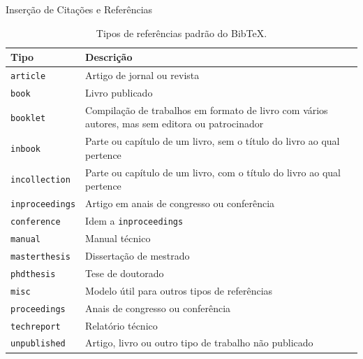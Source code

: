 \documentclass[10pt]{beamer}
\begin{document}
\begin{frame}{Inserção de Citações e Referências}
    \vspace{-0.5em}
    \begin{table}[H]
    \centering
    \caption{Tipos de referências padrão do Bib\TeX{}.}
    \vspace{-0.5em}
    {\footnotesize
        \begin{tabular}{p{2.5cm}p{7cm}}
        \toprule
        \textbf{Tipo} & \textbf{Descrição} \\
        \midrule
        {\tt article}       & Artigo de jornal ou revista \\
        {\tt book}          & Livro publicado \\
        {\tt booklet}       & Compilação de trabalhos em formato de livro com vários autores, mas sem editora ou patrocinador \\
        {\tt inbook}        & Parte ou capítulo de um livro, sem o título do livro ao qual pertence \\
        {\tt incollection}  & Parte ou capítulo de um livro, com o título do livro ao qual pertence \\
        {\tt inproceedings} & Artigo em anais de congresso ou conferência \\
        {\tt conference}    & Idem a {\tt inproceedings} \\
        {\tt manual}        & Manual técnico \\
        {\tt masterthesis}  & Dissertação de mestrado \\
        {\tt phdthesis}     & Tese de doutorado \\
        {\tt misc}          & Modelo útil para outros tipos de referências \\
        {\tt proceedings}   & Anais de congresso ou conferência \\
        {\tt techreport}    & Relatório técnico \\
        {\tt unpublished}   & Artigo, livro ou outro tipo de trabalho não publicado \\
        \bottomrule
        \end{tabular}
    }
    \end{table}
\end{frame}

\end{document}
